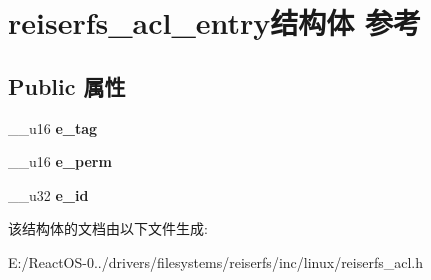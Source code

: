 \hypertarget{structreiserfs__acl__entry}{}\section{reiserfs\+\_\+acl\+\_\+entry结构体 参考}
\label{structreiserfs__acl__entry}
\subsection*{Public 属性}
\begin{DoxyCompactItemize}
\item 
\mbox{\label{structreiserfs__acl__entry_a961425d9a64e2ced1fa6ce0fbe5b64fa}} 
\+\_\+\+\_\+u16 {\bfseries e\+\_\+tag}
\item 
\mbox{\label{structreiserfs__acl__entry_a5321610ed8862ccd1adeee637ea981b9}} 
\+\_\+\+\_\+u16 {\bfseries e\+\_\+perm}
\item 
\mbox{\label{structreiserfs__acl__entry_afc24a621f1c41fdf4dfdb900e4272ccf}} 
\+\_\+\+\_\+u32 {\bfseries e\+\_\+id}
\end{DoxyCompactItemize}


该结构体的文档由以下文件生成\+:\begin{DoxyCompactItemize}
\item 
E\+:/\+React\+O\+S-\/0../drivers/filesystems/reiserfs/inc/linux/reiserfs\+\_\+acl.\+h\end{DoxyCompactItemize}
